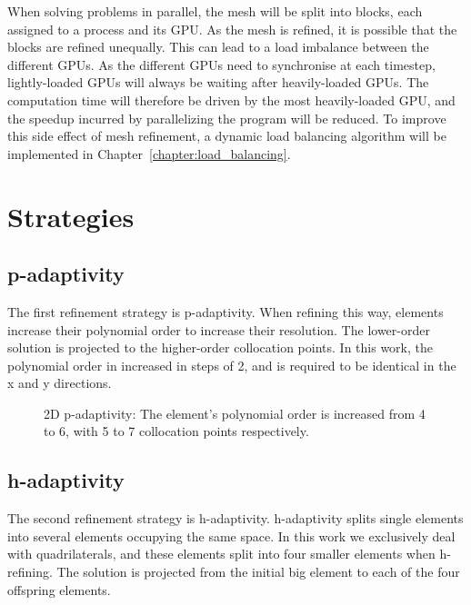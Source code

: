 When solving problems in parallel, the mesh will be split into blocks, each assigned to a process
and its GPU. As the mesh is refined, it is possible that the blocks are refined unequally. This can
lead to a load imbalance between the different GPUs. As the different GPUs need to synchronise at
each timestep, lightly-loaded GPUs will always be waiting after heavily-loaded GPUs. The computation
time will therefore be driven by the most heavily-loaded GPU, and the speedup incurred by
parallelizing the program will be reduced. To improve this side effect of mesh refinement, a dynamic
load balancing algorithm will be implemented in Chapter~\ref{chapter:load_balancing}.

\section{Strategies} \label{section:adaptive_mesh_refinement:adaptivity_strategies}

\subsection{p-adaptivity} \label{subsection:adaptive_mesh_refinement:adaptivity_strategies:p-adaptivity}

The first refinement strategy is p-adaptivity. When refining this way, elements increase their
polynomial order to increase their resolution. The lower-order solution is projected to the
higher-order collocation points. In this work, the polynomial order in increased in steps of 2, and
is required to be identical in the x and y directions. 

\begin{figure}[H]
	\centering
	
	\caption{2D p-adaptivity: The element's polynomial order is increased from 4 to 6, with 5 to 7 collocation points respectively.}
	\label{fig:p-adaptivity}
\end{figure}

\subsection{h-adaptivity} \label{subsection:adaptive_mesh_refinement:adaptivity_strategies:h-adaptivity}

The second refinement strategy is h-adaptivity. h-adaptivity splits single elements into several
elements occupying the same space. In this work we exclusively deal with quadrilaterals, and these
elements split into four smaller elements when h-refining. The solution is projected from the
initial big element to each of the four offspring elements.

